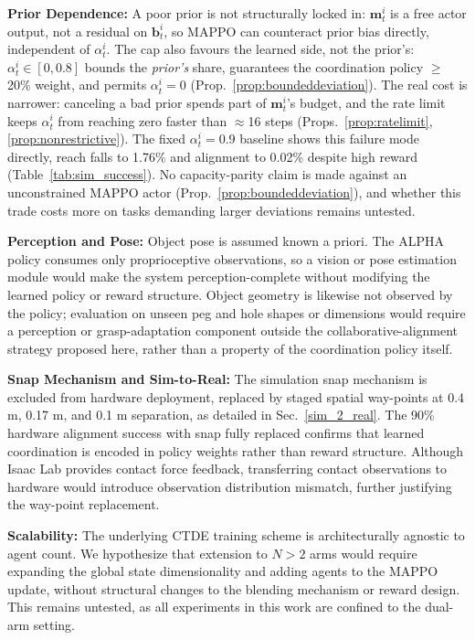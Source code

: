 \documentclass[a4paper,fleqn]{cas-dc}
\begin{document}
\noindent\textbf{Prior Dependence:} A poor prior is not structurally locked in: $\mathbf{m}_t^i$ is a free actor output, not a residual on $\mathbf{b}_t^i$, so MAPPO can counteract prior bias directly, independent of $\alpha_t^i$. The cap also favours the learned side, not the prior's: $\alpha_t^i \in [0,0.8]$ bounds the \emph{prior's} share, guarantees the coordination policy $\geq$20\% weight, and permits $\alpha_t^i=0$ (Prop.~\ref{prop:boundeddeviation}). The real cost is narrower: canceling a bad prior spends part of $\mathbf{m}_t^i$'s budget, and the rate limit keeps $\alpha_t^i$ from reaching zero faster than $\approx$16 steps (Props.~\ref{prop:ratelimit}, \ref{prop:nonrestrictive}). The fixed $\alpha_t^i=0.9$ baseline shows this failure mode directly, reach falls to 1.76\% and alignment to 0.02\% despite high reward (Table~\ref{tab:sim_success}). No capacity-parity claim is made against an unconstrained MAPPO actor (Prop.~\ref{prop:boundeddeviation}), and whether this trade costs more on tasks demanding larger deviations remains untested.

\noindent \textbf{Perception and Pose:} Object pose is assumed known a priori. The ALPHA policy consumes only proprioceptive observations, so a vision or pose estimation module would make the system perception-complete without modifying the learned policy or reward structure. Object geometry is likewise not observed by the policy; evaluation on unseen peg and hole shapes or dimensions would require a perception or grasp-adaptation component outside the collaborative-alignment strategy proposed here, rather than a property of the coordination policy itself.

\noindent\textbf{Snap Mechanism and Sim-to-Real:} The simulation snap mechanism is excluded from hardware deployment, replaced by staged spatial way-points at 0.4 m, 0.17 m, and 0.1 m separation, as detailed in Sec.~\ref{sim_2_real}. The 90\% hardware alignment success with snap fully replaced confirms that learned coordination is encoded in policy weights rather than reward structure. Although Isaac Lab provides contact force feedback, transferring contact observations to hardware would introduce observation distribution mismatch, further justifying the way-point replacement.

\noindent\textbf{Scalability:} The underlying CTDE training scheme is architecturally agnostic to agent count. We hypothesize that extension to $N>2$ arms would require expanding the global state dimensionality and adding agents to the MAPPO update, without structural changes to the blending mechanism or reward design. This remains untested, as all experiments in this work are confined to the dual-arm setting.
\end{document}
